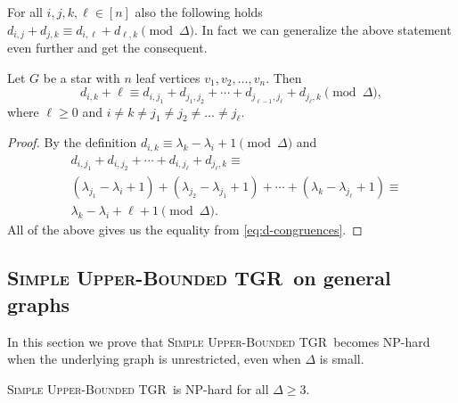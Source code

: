 \documentclass[a4paper,UKenglish,cleveref, autoref, thm-restate]{lipics-v2021}
\newcommand{\deltaUpperBound}{\textsc{Simple Upper-Bounded TGR}}
\begin{document}
For all $i,j,k,\ell \in [n]$ also the following holds
$
    d_{i,j} + d_{j,k} \equiv d_{i, \ell} + d_{\ell, k} \pmod \Delta.
$
In fact we can generalize the above statement even further and get the consequent.
\begin{observation}
    Let $G$ be a star with $n$ leaf vertices $v_1, v_2, \dots, v_n$.
    Then
    \begin{equation}\label{eq:d-congruences}
    d_{i,k} + \ell \equiv d_{i, {j_1}} + d_{j_1, {j_2}} + \cdots + d_{j_{\ell -1}, {j_\ell}} + d_{j_\ell,k} \pmod \Delta,
    \end{equation}
    where $\ell \geq 0$ and $i \neq k \neq j_1 \neq j_2 \neq \dots \neq j_\ell$.
\end{observation}
%
\begin{proof}
    By the definition $d_{i,k} \equiv \lambda_k - \lambda_i + 1 \pmod \Delta$
    and
    \begin{align*}
        & 
        d_{i, {j_1}} + d_{i, {j_2}} + \cdots + d_{i, {j_\ell}} + d_{j_\ell,k}
        \equiv \\
        &
        (\lambda_{j_1} - \lambda_i + 1) +
        (\lambda_{j_2} - \lambda_{j_1} + 1) + \cdots +
        (\lambda_{k} - \lambda_{j_\ell} + 1)
        \equiv \\
        &
        \lambda_k - \lambda_i + \ell + 1 
        \pmod \Delta.
    \end{align*}
    All of the above gives us the equality from \cref{eq:d-congruences}.
\end{proof}


\subsection{\deltaUpperBound\ on general graphs}
In this section we prove that \deltaUpperBound\ becomes NP-hard when the underlying graph is unrestricted, even when $\Delta$ is small.

\begin{theorem}\label{thm:NP-upperBound}
	\deltaUpperBound\ is NP-hard for all $\Delta \geq 3$.
\end{theorem}
\end{document}
